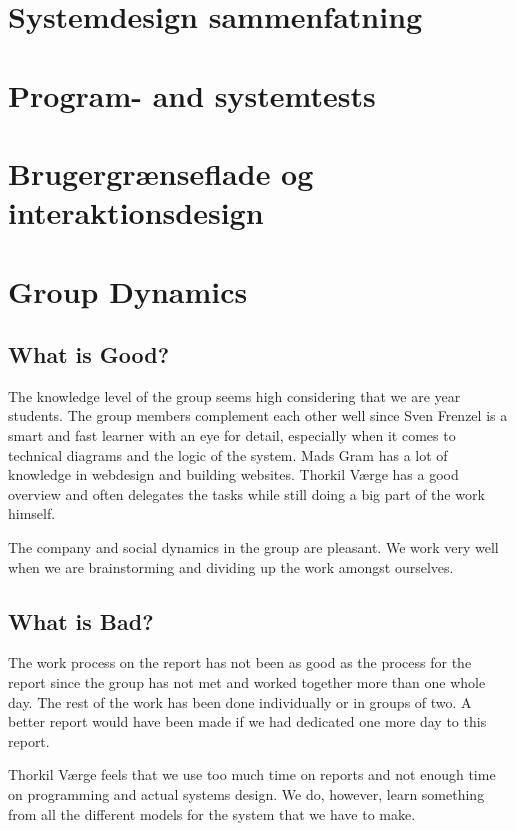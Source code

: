 \documentclass[11pt,a4paper]{report}
\begin{document}
\section{Systemdesign sammenfatning}\label{sec:Systemdesign_sammenfatning}

\section{Program- and systemtests}\label{sec:Program_systemtests}

\section{Brugergrænseflade og interaktionsdesign}

\section{Group Dynamics}
\subsection{What is Good?}
The knowledge level of the group seems high considering that we are  year students. The group members complement each other well since Sven Frenzel is a smart and fast learner with an eye for detail, especially when it comes to technical diagrams and the logic of the system. Mads Gram has a lot of knowledge in webdesign and building websites. Thorkil Værge has a good overview and often delegates the tasks while still doing a big part of the work himself.

The company and social dynamics in the group are pleasant. We work very well when we are brainstorming and dividing up the work amongst ourselves.

\subsection{What is Bad?}
The work process on the  report has not been as good as the process for the  report since the group has not met and worked together more than one whole day. The rest of the work has been done individually or in groups of two. A better report would have been made if we had dedicated one more day to this report.

Thorkil Værge feels that we use too much time on reports and not enough time on programming and actual systems design. We do, however, learn something from all the different models for the system that we have to make.
\end{document}
